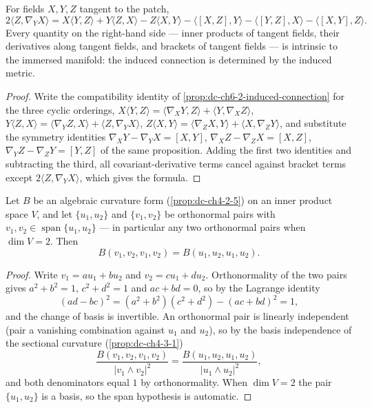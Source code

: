 \begin{lemma}
  \label{lem:dc-ch6-2-7-koszul}
  \leanok
  For fields $X,Y,Z$ tangent to the patch,
  $$
  2\langle Z,\nabla_YX\rangle
    = X\langle Y,Z\rangle + Y\langle Z,X\rangle - Z\langle X,Y\rangle
      - \langle[X,Z],Y\rangle - \langle[Y,Z],X\rangle - \langle[X,Y],Z\rangle.
  $$
  Every quantity on the right-hand side — inner products of tangent fields,
  their derivatives along tangent fields, and brackets of tangent fields — is
  intrinsic to the immersed manifold: the induced connection is determined by
  the induced metric.
\end{lemma}
\begin{proof}
  \leanok
  \sketch
  Write the compatibility identity of \cref{prop:dc-ch6-2-induced-connection}
  for the three cyclic orderings,
  $X\langle Y,Z\rangle=\langle\nabla_XY,Z\rangle+\langle Y,\nabla_XZ\rangle$,
  $Y\langle Z,X\rangle=\langle\nabla_YZ,X\rangle+\langle Z,\nabla_YX\rangle$,
  $Z\langle X,Y\rangle=\langle\nabla_ZX,Y\rangle+\langle X,\nabla_ZY\rangle$,
  and substitute the symmetry identities
  $\nabla_XY-\nabla_YX=[X,Y]$, $\nabla_XZ-\nabla_ZX=[X,Z]$,
  $\nabla_YZ-\nabla_ZY=[Y,Z]$ of the same proposition. Adding the first two
  identities and subtracting the third, all covariant-derivative terms cancel
  against bracket terms except $2\langle Z,\nabla_YX\rangle$, which gives the
  formula.
\end{proof}

\begin{lemma}
  \label{lem:dc-ch6-2-7-plane}
  \leanok
  Let $B$ be an algebraic curvature form (\cref{prop:dc-ch4-2-5}) on an inner
  product space $V$, and let $\{u_1,u_2\}$ and $\{v_1,v_2\}$ be orthonormal
  pairs with $v_1,v_2\in\operatorname{span}\{u_1,u_2\}$ — in particular any two
  orthonormal pairs when $\dim V=2$. Then
  $$
  B(v_1,v_2,v_1,v_2)=B(u_1,u_2,u_1,u_2).
  $$
\end{lemma}
\begin{proof}
  \leanok
  \sketch
  Write $v_1=au_1+bu_2$ and $v_2=cu_1+du_2$. Orthonormality of the two pairs
  gives $a^2+b^2=1$, $c^2+d^2=1$ and $ac+bd=0$, so by the Lagrange identity
  $$
  (ad-bc)^2=(a^2+b^2)(c^2+d^2)-(ac+bd)^2=1,
  $$
  and the change of basis is invertible. An orthonormal pair is linearly
  independent (pair a vanishing combination against $u_1$ and $u_2$), so by
  the basis independence of the sectional curvature (\cref{prop:dc-ch4-3-1})
  $$
  \frac{B(v_1,v_2,v_1,v_2)}{|v_1\wedge v_2|^2}
    =\frac{B(u_1,u_2,u_1,u_2)}{|u_1\wedge u_2|^2},
  $$
  and both denominators equal $1$ by orthonormality. When $\dim V=2$ the pair
  $\{u_1,u_2\}$ is a basis, so the span hypothesis is automatic.
\end{proof}

